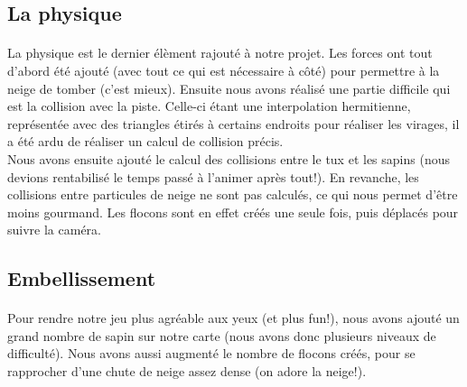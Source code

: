 \documentclass[11pt]{article}
\begin{document}
    \subsection{La physique}

    \paragraph{}
    La physique est le dernier élèment rajouté à notre projet.
    Les forces ont tout d'abord été ajouté (avec tout ce qui est nécessaire à côté) pour permettre à la neige de tomber (c'est mieux).
    Ensuite nous avons réalisé une partie difficile qui est la collision avec la piste.
    Celle-ci étant une interpolation hermitienne, représentée avec des triangles étirés à certains endroits pour réaliser les virages, il a été ardu de réaliser un calcul de collision précis.\\
    Nous avons ensuite ajouté le calcul des collisions entre le tux et les sapins (nous devions rentabilisé le temps passé à l'animer après tout!).
    En revanche, les collisions entre particules de neige ne sont pas calculés, ce qui nous permet d'être moins gourmand.
    Les flocons sont en effet créés une seule fois, puis déplacés pour suivre la caméra.

    \subsection{Embellissement}

    \paragraph{}
    Pour rendre notre jeu plus agréable aux yeux (et plus fun!), nous avons ajouté un grand nombre de sapin sur notre carte (nous avons donc plusieurs niveaux de difficulté).
    Nous avons aussi augmenté le nombre de flocons créés, pour se rapprocher d'une chute de neige assez dense (on adore la neige!).
\end{document}
